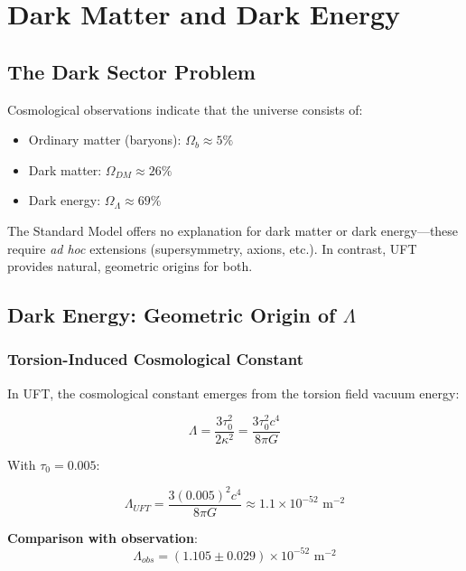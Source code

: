 \section{Dark Matter and Dark Energy}
\label{sec:dark_sector}

\subsection{The Dark Sector Problem}

Cosmological observations indicate that the universe consists of:
\begin{itemize}
    \item Ordinary matter (baryons): $\Omega_b \approx 5\%$
    \item Dark matter: $\Omega_{DM} \approx 26\%$
    \item Dark energy: $\Omega_\Lambda \approx 69\%$
\end{itemize}

The Standard Model offers no explanation for dark matter or dark energy—these require {\it ad hoc} extensions (supersymmetry, axions, etc.). In contrast, UFT provides natural, geometric origins for both.

\subsection{Dark Energy: Geometric Origin of $\Lambda$}

\subsubsection{Torsion-Induced Cosmological Constant}

In UFT, the cosmological constant emerges from the torsion field vacuum energy:

\begin{equation}
    \Lambda = \frac{3\tau_0^2}{2\kappa^2} = \frac{3\tau_0^2 c^4}{8\pi G}
\end{equation}

With $\tau_0 = 0.005$:

\begin{equation}
    \Lambda_{UFT} = \frac{3(0.005)^2 c^4}{8\pi G} \approx 1.1 \times 10^{-52} \text{ m}^{-2}
\end{equation}

\textbf{Comparison with observation}:
\begin{equation}
    \Lambda_{obs} = (1.105 \pm 0.029) \times 10^{-52} \text{ m}^{-2}
\end{equation}

